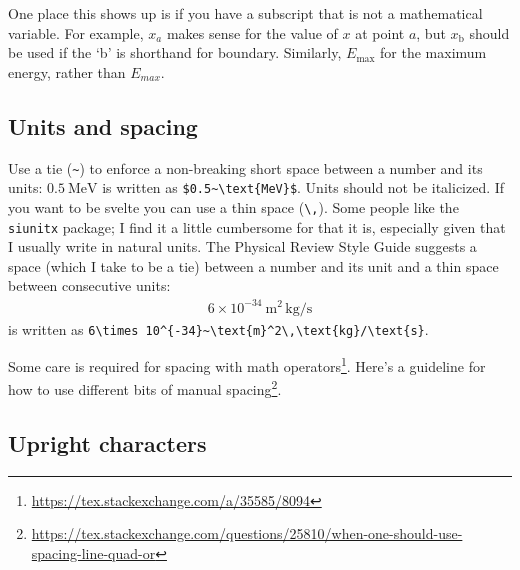 One place this shows up is if you have a subscript that is not a mathematical variable. For example, $x_a$ makes sense for the value of $x$ at point $a$, but $x_\text{b}$ should be used if the `b' is shorthand for boundary. Similarly, $E_\text{max}$ for the maximum energy, rather than $E_{max}$.


\subsection{Units and spacing}

Use a tie (\verb!~!) to enforce a non-breaking short space between a number and its units: $0.5~\text{MeV}$ is written as \verb!$0.5~\text{MeV}$!. Units should not be italicized. If you want to be svelte you can use a thin space (\verb!\,!).  Some people like the \texttt{siunitx} package; I find it a little cumbersome for that it is, especially given that I usually write in natural units. The Physical Review Style Guide suggests a space (which I take to be a tie) between a number and its unit and a thin space between consecutive units:
\begin{align}
	6\times 10^{-34}~\text{m}^2\,\text{kg}/\text{s}
\end{align}
is written as \verb!6\times 10^{-34}~\text{m}^2\,\text{kg}/\text{s}!.


Some care is required for spacing with math operators\footnote{\url{https://tex.stackexchange.com/a/35585/8094}}. Here's a guideline for how to use different bits of manual spacing\footnote{\url{https://tex.stackexchange.com/questions/25810/when-one-should-use-spacing-line-quad-or}}.


\subsection{Upright characters}

